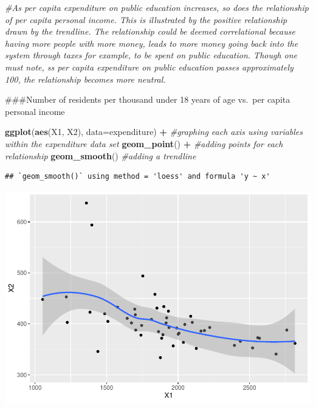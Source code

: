 \documentclass[]{article}
\newenvironment{Shaded}{\begin{snugshade}}{\end{snugshade}}
\newcommand{\CommentTok}[1]{\textcolor[rgb]{0.56,0.35,0.01}{\textit{#1}}}
\newcommand{\DataTypeTok}[1]{\textcolor[rgb]{0.13,0.29,0.53}{#1}}
\newcommand{\KeywordTok}[1]{\textcolor[rgb]{0.13,0.29,0.53}{\textbf{#1}}}
\newcommand{\NormalTok}[1]{#1}
\newcommand{\OperatorTok}[1]{\textcolor[rgb]{0.81,0.36,0.00}{\textbf{#1}}}
\newcommand{\StringTok}[1]{\textcolor[rgb]{0.31,0.60,0.02}{#1}}
\begin{document}
\begin{Shaded}
\begin{Highlighting}[]
\CommentTok{#As per capita expenditure on public education increases, so does the relationship of per capita personal income. This is illustrated by the positive relationship drawn by the trendline. The relationship could be deemed correlational because having more people with more money, leads to more money going back into the system through taxes for example, to be spent on public education. Though one must note, ss per capita expenditure on public education passes approximately 100, the relationship becomes more neutral.}
\end{Highlighting}
\end{Shaded}

\#\#\#Number of residents per thousand under 18 years of age vs.~per
capita personal income

\begin{Shaded}
\begin{Highlighting}[]
\KeywordTok{ggplot}\NormalTok{(}\KeywordTok{aes}\NormalTok{(X1, X2), }\DataTypeTok{data=}\NormalTok{expenditure) }\OperatorTok{+}\StringTok{ }\CommentTok{#graphing each axis using variables within the expenditure data set}
\StringTok{  }\KeywordTok{geom_point}\NormalTok{() }\OperatorTok{+}\StringTok{ }\CommentTok{#adding points for each relationship}
\StringTok{  }\KeywordTok{geom_smooth}\NormalTok{() }\CommentTok{#adding a trendline}
\end{Highlighting}
\end{Shaded}

\begin{verbatim}
## `geom_smooth()` using method = 'loess' and formula 'y ~ x'
\end{verbatim}

\includegraphics{PS_answers_files/figure-latex/unnamed-chunk-7-1.pdf}
\end{document}

